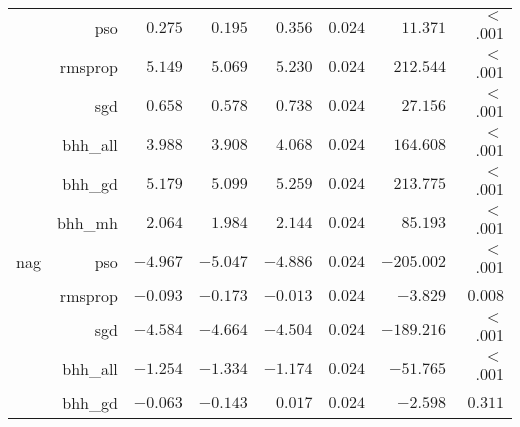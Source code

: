 \begin{table}[htbp]
{\begin{tabular}{lrrrrrrr}
			$ $                  & pso                  & $0.275$              & $0.195$                                         & $0.356$              & $0.024$              & $11.371$             & $<$ .001    \\
			                     & rmsprop              & $5.149$              & $5.069$                                         & $5.230$              & $0.024$              & $212.544$            & $<$ .001    \\
			                     & sgd                  & $0.658$              & $0.578$                                         & $0.738$              & $0.024$              & $27.156$             & $<$ .001    \\
			                     & bhh\_all             & $3.988$              & $3.908$                                         & $4.068$              & $0.024$              & $164.608$            & $<$ .001    \\
			                     & bhh\_gd              & $5.179$              & $5.099$                                         & $5.259$              & $0.024$              & $213.775$            & $<$ .001    \\
			                     & bhh\_mh              & $2.064$              & $1.984$                                         & $2.144$              & $0.024$              & $85.193$             & $<$ .001    \\
			nag                  & pso                  & $-4.967$             & $-5.047$                                        & $-4.886$             & $0.024$              & $-205.002$           & $<$ .001    \\
			$ $                  & rmsprop              & $-0.093$             & $-0.173$                                        & $-0.013$             & $0.024$              & $-3.829$             & $0.008$     \\
			                     & sgd                  & $-4.584$             & $-4.664$                                        & $-4.504$             & $0.024$              & $-189.216$           & $<$ .001    \\
			                     & bhh\_all             & $-1.254$             & $-1.334$                                        & $-1.174$             & $0.024$              & $-51.765$            & $<$ .001    \\
			                     & bhh\_gd              & $-0.063$             & $-0.143$                                        & $0.017$              & $0.024$              & $-2.598$             & $0.311$     \\

\end{tabular}}
\end{table}
